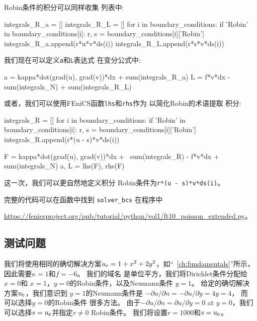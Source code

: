 Robin条件的积分可以同样收集
列表中:

\begin{python}
integrals_R_a = []
integrals_R_L = []
for i in boundary_conditions:
    if 'Robin' in boundary_conditions[i]:
        r, s = boundary_conditions[i]['Robin']
        integrals_R_a.append(r*u*v*ds(i))
        integrals_R_L.append(r*s*v*ds(i))
\end{python}

我们现在可以定义\texttt{a}和\texttt{L}表达式
在变分公式中:

\begin{python}
a = kappa*dot(grad(u), grad(v))*dx + sum(integrals_R_a)
L = f*v*dx - sum(integrals_N) + sum(integrals_R_L)
\end{python}


或者，我们可以使用FEniCS函数\texttt{lhs}和\texttt{rhs}作为
以简化Robin的术语提取
积分:

\begin{python}
integrals_R = []
for i in boundary_conditions:
    if 'Robin' in boundary_conditions[i]:
        r, s = boundary_conditions[i]['Robin']
        integrals_R.append(r*(u - s)*v*ds(i))

F = kappa*dot(grad(u), grad(v))*dx + \
    sum(integrals_R) - f*v*dx + sum(integrals_N)
a, L = lhs(F), rhs(F)
\end{python}
这一次，我们可以更自然地定义积分
Robin条件为\texttt{r*(u - s)*v*ds(i)}。

完整的代码可以在函数中找到
\verb!solver_bcs! 在程序中
\begin{center}
\url{https://fenicsproject.org/pub/tutorial/python/vol1/ft10_poisson_extended.py}。
\end{center}

\subsection{测试问题}

我们将使用相同的确切解决方案$u_{\mbox{\footnotesize e}} = 1 + x^2 + 2y^2$，如“~\ref{ch:fundamentals}”所示，因此需要$\kappa = 1$和$f = -6$。 我们的域名
是单位平方，我们将Dirichlet条件分配给$x = 0$和
$x = 1$，$y = 0$的Robin条件，以及Neumann条件
$y =1$。 给定的确切解决方案$u_{\mbox{\footnotesize e}}$，我们意识到
$y = 1$的Neumann条件是
$-\partial u / \partial n = -\partial u /\partial y = 4y = 4$，
而可以选择$y = 0$的Robin条件
很多方法。 由于$-\partial u/\partial n=\partial u/\partial y = 0$ at
$y = 0$，我们可以选择$s = u_{\mbox{\footnotesize e}}$并指定$r \neq 0$
Robin条件。 我们将设置$r = 1000$和$s = u_{\mbox{\footnotesize e}}$。


